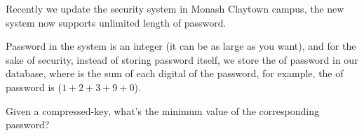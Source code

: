 Recently we update the security system in Monash Claytown campus, 
the new system now supports unlimited length of password.

Password in the system is an integer (it can be as large as you want), and for the sake of
security, instead of storing password itself, we store the  of password in
our database, where  is the sum of each digital of the password, for
example, the  of password  is  ($1+2+3+9+0$).

Given a compressed-key, what's the minimum value of the corresponding password?
